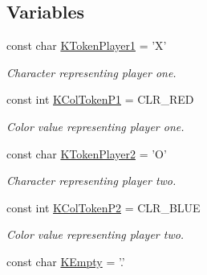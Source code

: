 \subsection*{Variables}
\begin{DoxyCompactItemize}
\item 
\hypertarget{namespace_chase_game_a8452e2d6de618e4ca7a9f76b082b52a4}{const char \hyperlink{namespace_chase_game_a8452e2d6de618e4ca7a9f76b082b52a4}{K\-Token\-Player1} = 'X'}\label{namespace_chase_game_a8452e2d6de618e4ca7a9f76b082b52a4}

\begin{DoxyCompactList}\small\item\em Character representing player one. \end{DoxyCompactList}\item 
\hypertarget{namespace_chase_game_a344097ba56ffd5b44cb5bdefb810aa36}{const int \hyperlink{namespace_chase_game_a344097ba56ffd5b44cb5bdefb810aa36}{K\-Col\-Token\-P1} = C\-L\-R\-\_\-\-R\-E\-D}\label{namespace_chase_game_a344097ba56ffd5b44cb5bdefb810aa36}

\begin{DoxyCompactList}\small\item\em Color value representing player one. \end{DoxyCompactList}\item 
\hypertarget{namespace_chase_game_ae27343407c21a8d6e3cf26b736bd5527}{const char \hyperlink{namespace_chase_game_ae27343407c21a8d6e3cf26b736bd5527}{K\-Token\-Player2} = 'O'}\label{namespace_chase_game_ae27343407c21a8d6e3cf26b736bd5527}

\begin{DoxyCompactList}\small\item\em Character representing player two. \end{DoxyCompactList}\item 
\hypertarget{namespace_chase_game_a72a7e46de0167b9219b10c0c388b3c98}{const int \hyperlink{namespace_chase_game_a72a7e46de0167b9219b10c0c388b3c98}{K\-Col\-Token\-P2} = C\-L\-R\-\_\-\-B\-L\-U\-E}\label{namespace_chase_game_a72a7e46de0167b9219b10c0c388b3c98}

\begin{DoxyCompactList}\small\item\em Color value representing player two. \end{DoxyCompactList}\item 
\hypertarget{namespace_chase_game_aa036d4de40188ba2e1aa36ab6cfaf1da}{const char \hyperlink{namespace_chase_game_aa036d4de40188ba2e1aa36ab6cfaf1da}{K\-Empty} = '.'}\label{namespace_chase_game_aa036d4de40188ba2e1aa36ab6cfaf1da}


\end{DoxyCompactItemize}

